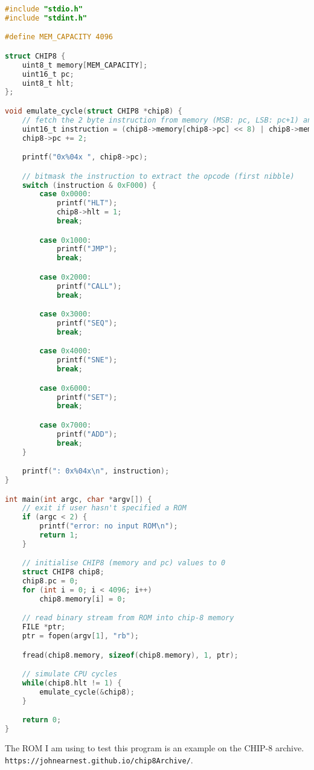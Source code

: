 \begin{lstlisting}[language=C]
#include "stdio.h"
#include "stdint.h"

#define MEM_CAPACITY 4096

struct CHIP8 {
    uint8_t memory[MEM_CAPACITY];
    uint16_t pc;
    uint8_t hlt;
};

void emulate_cycle(struct CHIP8 *chip8) {
    // fetch the 2 byte instruction from memory (MSB: pc, LSB: pc+1) and store in a 16-bit unsigned int
    uint16_t instruction = (chip8->memory[chip8->pc] << 8) | chip8->memory[chip8->pc+1];
    chip8->pc += 2;

    printf("0x%04x ", chip8->pc);

    // bitmask the instruction to extract the opcode (first nibble) 
    switch (instruction & 0xF000) {
        case 0x0000:
            printf("HLT");
            chip8->hlt = 1;
            break;

        case 0x1000:
            printf("JMP");
            break;

        case 0x2000:
            printf("CALL");
            break;

        case 0x3000:
            printf("SEQ"); 
            break;

        case 0x4000:
            printf("SNE");
            break;

        case 0x6000:
            printf("SET");
            break;

        case 0x7000:
            printf("ADD");
            break;
    }

    printf(": 0x%04x\n", instruction);
}

int main(int argc, char *argv[]) {
    // exit if user hasn't specified a ROM
    if (argc < 2) {
        printf("error: no input ROM\n");
        return 1;
    }

    // initialise CHIP8 (memory and pc) values to 0
    struct CHIP8 chip8;
    chip8.pc = 0;
    for (int i = 0; i < 4096; i++)
        chip8.memory[i] = 0;

    // read binary stream from ROM into chip-8 memory
    FILE *ptr;
    ptr = fopen(argv[1], "rb");

    fread(chip8.memory, sizeof(chip8.memory), 1, ptr);

    // simulate CPU cycles
    while(chip8.hlt != 1) {
        emulate_cycle(&chip8);
    }

    return 0;
}
\end{lstlisting}

The ROM I am using to test this program is an example on the CHIP-8 archive. \texttt{https://johnearnest.github.io/chip8Archive/}.

